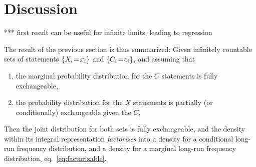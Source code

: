 \documentclass[\ifafour a4paper,12pt,\else a5paper,10pt,\fi%
onecolumn,oneside,article,%
british%
]{memoir}
\makeatletter
\newcommand*{\widefbox}[1]{\fbox{\hspace*{1ex}#1\hspace*{1ex}}}
\theoremstyle{remark}
\theoremstyle{innote}
\def\sum{\DOTSI\sumop\slimits@}
\newcommand*{\de}{\partialup}%
\DeclarePairedDelimiter\set{\{}{\}}
\newcommand*{\p}{\mathrm{P}}%
\renewcommand*{\|}[1][]{\nonscript\,#1\vert\nonscript\,\mathopen{}}
\newcommand*{\eqn}{eq.}%
\newcommand*{\tsum}{\mathop{\textstyle\sum}\nolimits}
\renewcommand*{\=}{\TextOrMath\texteq\eq}
\newcommand*{\X}[1]{X_{#1}}
\newcommand*{\x}[1]{x_{#1}}
\newcommand*{\C}[1]{C_{#1}}
\newcommand*{\cc}[1]{c_{#1}}
\makeatother
\begin{document}
\section{Discussion}
\label{sec:discuss}

*** first result can be useful for infinite limits, leading to regression


The result of the previous section is thus summarized: Given infinitely
countable sets of statements $\set{\X{i}\=\x{i}}$ and
$\set{\C{i}\=\cc{i}}$, and assuming that
\begin{enumerate}[wide]
\item the marginal probability distribution for the $C$ statements is fully
  exchangeable,
\item the probability distribution for the $X$ statements is partially (or
  conditionally) exchangeable given the $C$,
\end{enumerate}
Then the joint distribution for both sets is fully exchangeable, and the
density within its integral representation \emph{factorizes} into a density
for a conditional long-run frequency distribution, and a density for a
marginal long-run frequency distribution, \eqn~\eqref{eq:factorizable}.









\end{document}

